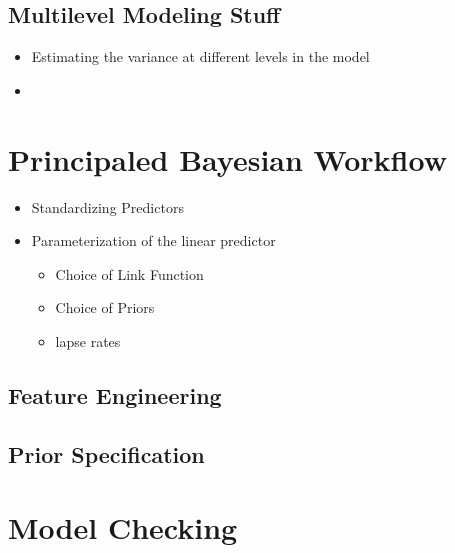 \documentclass[
]{article}
\providecommand{\tightlist}{%
  \setlength{\itemsep}{0pt}\setlength{\parskip}{0pt}}
\begin{document}
\hypertarget{multilevel-modeling-stuff}{%
\subsection{Multilevel Modeling Stuff}\label{multilevel-modeling-stuff}}

\begin{itemize}
\item
  Estimating the variance at different levels in the model
\item
\end{itemize}

\hypertarget{workflow}{%
\section{Principaled Bayesian Workflow}\label{workflow}}

\begin{itemize}
\tightlist
\item
  Standardizing Predictors
\item
  Parameterization of the linear predictor

  \begin{itemize}
  \tightlist
  \item
    Choice of Link Function
  \item
    Choice of Priors
  \item
    lapse rates
  \end{itemize}
\end{itemize}

\hypertarget{feature-engineering}{%
\subsection{Feature Engineering}\label{feature-engineering}}

\hypertarget{prior-specification}{%
\subsection{Prior Specification}\label{prior-specification}}

\hypertarget{model-checking}{%
\section{Model Checking}\label{model-checking}}
\end{document}
